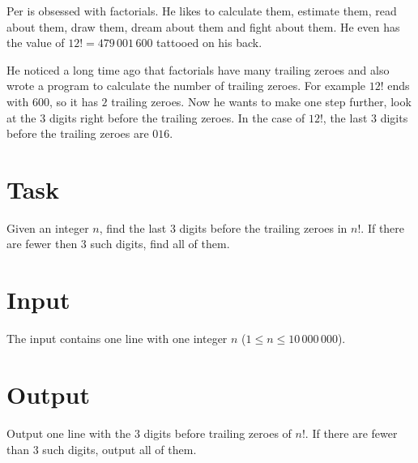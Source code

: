 Per is obsessed with factorials. He likes to calculate them,
estimate them, read about them, draw them, dream about them
and fight about them. He even has the value of $12! = 479\,001\,600$
tattooed on his back.

He noticed a long time ago that factorials have many trailing
zeroes and also wrote a program to calculate the number of trailing
zeroes. For example $12!$ ends with $600$, so it has $2$ trailing zeroes.
Now he wants to make one step further, look at the $3$ digits right
before the trailing zeroes. In the case of $12!$, the last $3$ digits before
the trailing zeroes are $016$.

\section*{Task}
Given an integer $n$, find the last 3 digits before the trailing zeroes in $n!$.
If there are fewer then $3$ such digits, find all of them.

\section*{Input}
The input contains one line with one integer $n$ ($1 \le n \le 10\,000\,000$).

\section*{Output}
Output one line with the $3$ digits before trailing zeroes of $n!$. If there are fewer than $3$ such digits, output all of them.

